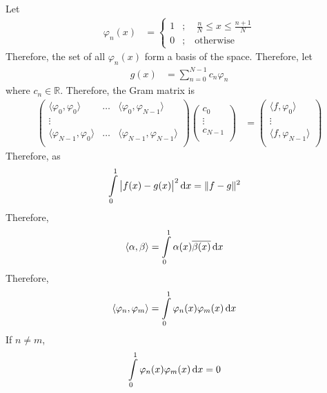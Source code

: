 \documentclass[fleqn, a4paper, 12pt, twoside, titlepage]{article}
\theoremstyle{definition}
\theoremstyle{theorem}
\begin{document}
\begin{solution}
	Let
	\begin{align*}
		\varphi_n(x) &=
			\begin{cases}
				1 &;\quad \frac{n}{N} \le x \le \frac{n + 1}{N}\\
				0 &;\quad \text{otherwise}
			\end{cases}
	\end{align*}
	Therefore, the set of all $\varphi_n(x)$ form a basis of the space.
	Therefore, let
	\begin{align*}
		g(x) &= \sum\limits_{n = 0}^{N - 1} c_n \varphi_n
	\end{align*}
	where $c_n \in \mathbb{R}$.
	Therefore, the Gram matrix is
	\begin{align*}
			\begin{pmatrix}
				\langle \varphi_0,\varphi_0 \rangle & \dots & \langle \varphi_0,\varphi_{N - 1} \rangle\\
				\vdots & &\\
				\langle \varphi_{N - 1},\varphi_0 \rangle & \dots & \langle \varphi_{N - 1},\varphi_{N - 1} \rangle\\
			\end{pmatrix}
			\begin{pmatrix}
				c_0\\
				\vdots\\
				c_{N - 1}\\
			\end{pmatrix}
		&=
			\begin{pmatrix}
				\langle f,\varphi_0 \rangle\\
				\vdots\\
				\langle f,\varphi_{N - 1} \rangle\\
			\end{pmatrix}
	\end{align*}
	Therefore, as
	\begin{align*}
		\int\limits_{0}^{1} \left| f(x) - g(x) \right|^2 \dif x &= \|f - g\|^2
	\end{align*}
	Therefore,
	\begin{align*}
		\langle \alpha,\beta \rangle &= \int\limits_{0}^{1} \alpha(x) \overline{\beta(x)} \dif x
	\end{align*}
	Therefore,
	\begin{align*}
		\langle \varphi_n,\varphi_m \rangle &= \int\limits_{0}^{1} \varphi_n(x) \varphi_m(x) \dif x
	\end{align*}
	If $n \neq m$,
	\begin{align*}
		\int\limits_{0}^{1} \varphi_n(x) \varphi_m(x) \dif x &= 0

\end{align*}
\end{solution}
\end{document}
